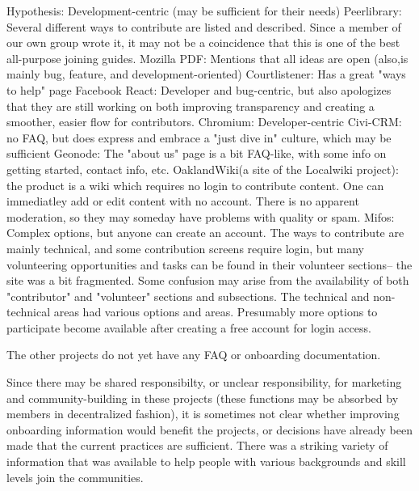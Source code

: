 Hypothesis: Development-centric (may be sufficient for their needs)
Peerlibrary: Several different ways to contribute are listed and described. Since a member of our own group wrote it, it may not be a coincidence that this is one of the best all-purpose joining guides.
Mozilla PDF: Mentions that all ideas are open (also,is mainly bug, feature, and development-oriented)
Courtlistener: Has a great "ways to help" page
Facebook React: Developer and bug-centric, but also apologizes that they are still working on both improving transparency and creating a smoother, easier flow for contributors.
Chromium: Developer-centric
Civi-CRM: no FAQ, but does express and embrace a "just dive in" culture, which may be sufficient
Geonode: The "about us" page is a bit FAQ-like, with some info on getting started, contact info, etc.
OaklandWiki(a site of the Localwiki project): the product is a wiki which requires no login to contribute content. One can immediatley add or edit content with no account. There is no apparent moderation, so they may someday have problems with quality or spam.
Mifos: Complex options, but anyone can create an account. The ways to contribute are mainly technical, and some contribution screens require login, but many volunteering opportunities and tasks can be found in their volunteer sections-- the site was a bit fragmented. Some confusion may arise from the availability of both "contributor" and "volunteer" sections and subsections. The technical and non-technical areas had various options and areas. Presumably more options to participate become available after creating a free account for login access.

The other projects do not yet have any FAQ or onboarding documentation.

Since there may be shared responsibilty, or unclear responsibility, for marketing and community-building in these projects (these functions may be absorbed by members in decentralized fashion), it is sometimes not clear whether improving onboarding information would benefit the projects, or decisions have already been made that the current practices are sufficient. There was a striking variety of information that was available to help people with various backgrounds and skill levels join the communities. 




